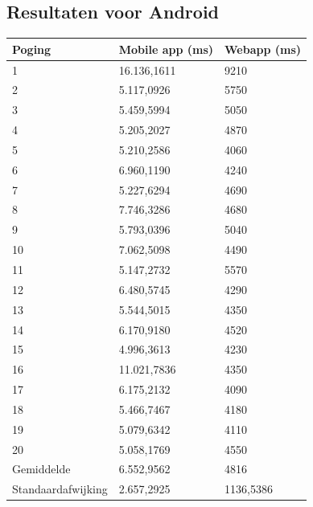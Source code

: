 \documentclass[pdftex,a4paper,12pt,twoside]{report}
\begin{document}
\subsection{Resultaten voor Android}
\begin{center}
  \begin{tabular}{ | l | l | l |}
    \hline
    Poging & Mobile app (ms) & Webapp (ms)
    \\ \hline
    1	& 16.136,1611 & 9210
    \\ \hline
    2	& 5.117,0926 & 5750
    \\ \hline
    3	& 5.459,5994 & 5050
    \\ \hline
    4	& 5.205,2027 & 4870
    \\ \hline
    5	& 5.210,2586 & 4060
    \\ \hline
    6	& 6.960,1190 & 4240
    \\ \hline
    7	& 5.227,6294 & 4690
    \\ \hline
    8	& 7.746,3286 & 4680
    \\ \hline
    9	& 5.793,0396 & 5040
    \\ \hline
    10	& 7.062,5098 & 4490
    \\ \hline
    11	& 5.147,2732 & 5570
    \\ \hline
    12	& 6.480,5745 & 4290
    \\ \hline
    13	& 5.544,5015 & 4350
    \\ \hline
    14	& 6.170,9180 & 4520
    \\ \hline
    15	& 4.996,3613 & 4230
    \\ \hline
    16	& 11.021,7836 & 4350
    \\ \hline
    17	& 6.175,2132 & 4090
    \\ \hline
    18	& 5.466,7467 & 4180
    \\ \hline
    19	& 5.079,6342 & 4110
    \\ \hline
    20	& 5.058,1769 & 4550
    \\ \hline
    Gemiddelde & 6.552,9562 & 4816
    \\ \hline
    Standaardafwijking & 2.657,2925 & 1136,5386
    \\ \hline
  \end{tabular}
\end{center}
\newpage
\end{document}
